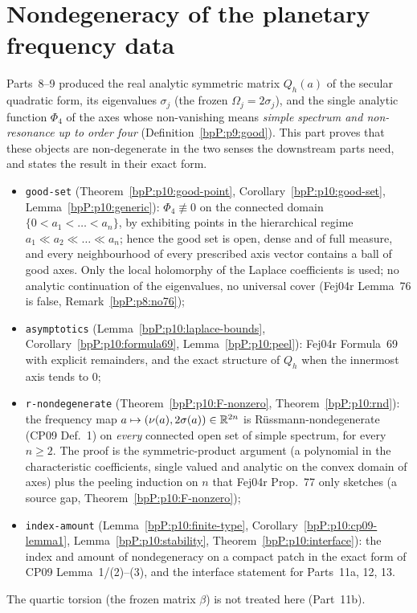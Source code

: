 \section{Nondegeneracy of the planetary frequency data}\label{bpP:p10}
\begingroup\sloppy

Parts~8--9 produced the real analytic symmetric matrix $Q_h(a)$ of the secular quadratic form, its eigenvalues $\sigma_j$ (the frozen $\Omega_j=2\sigma_j$), and the single analytic function $\Phi_4$ of the axes whose non-vanishing means \emph{simple spectrum and non-resonance up to order four} (Definition~\ref{bpP:p9:good}). This part proves that these objects are non-degenerate in the two senses the downstream parts need, and states the result in their exact form.
\begin{itemize}
\item \texttt{good-set} (Theorem~\ref{bpP:p10:good-point}, Corollary~\ref{bpP:p10:good-set}, Lemma~\ref{bpP:p10:generic}): $\Phi_4\not\equiv0$ on the connected domain $\{0<a_1<\dots<a_n\}$, by exhibiting points in the hierarchical regime $a_1\ll a_2\ll\dots\ll a_n$; hence the good set is open, dense and of full measure, and every neighbourhood of every prescribed axis vector contains a ball of good axes. Only the local holomorphy of the Laplace coefficients is used; no analytic continuation of the eigenvalues, no universal cover (Fej04r Lemma~76 is false, Remark~\ref{bpP:p8:no76});
\item \texttt{asymptotics} (Lemma~\ref{bpP:p10:laplace-bounds}, Corollary~\ref{bpP:p10:formula69}, Lemma~\ref{bpP:p10:peel}): Fej04r Formula~69 with explicit remainders, and the exact structure of $Q_h$ when the innermost axis tends to $0$;
\item \texttt{r-nondegenerate} (Theorem~\ref{bpP:p10:F-nonzero}, Theorem~\ref{bpP:p10:rnd}): the frequency map $a\mapsto(\nu(a),2\sigma(a))\in\mathbb{R}^{2n}$ is R\"ussmann-nondegenerate (CP09 Def.~1) on \emph{every} connected open set of simple spectrum, for every $n\ge2$. The proof is the symmetric-product argument (a polynomial in the characteristic coefficients, single valued and analytic on the convex domain of axes) plus the peeling induction on $n$ that Fej04r Prop.~77 only sketches (a source gap, Theorem~\ref{bpP:p10:F-nonzero});
\item \texttt{index-amount} (Lemma~\ref{bpP:p10:finite-type}, Corollary~\ref{bpP:p10:cp09-lemma1}, Lemma~\ref{bpP:p10:stability}, Theorem~\ref{bpP:p10:interface}): the index and amount of nondegeneracy on a compact patch in the exact form of CP09 Lemma~1/(2)--(3), and the interface statement for Parts~11a, 12, 13.
\end{itemize}
The quartic torsion (the frozen matrix $\beta$) is not treated here (Part~11b).

